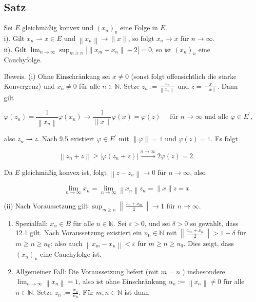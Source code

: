 \documentclass[10pt, letterpaper]{article}
\begin{document}
\subsection*{Satz}
Sei $E$ gleichmäßig konvex und $\left(x_{n}\right)_{n}$ eine Folge in $E$.\\
i). Gilt $x_{n} \rightharpoonup x \in E$ und $\left\|x_{n}\right\| \rightarrow\|x\|$, so folgt $x_{n} \rightarrow x$ für $n \rightarrow \infty$.\\
ii). Gilt $\lim _{n \rightarrow \infty} \sup _{m \geq n}\left|\left\|x_{m}+x_{n}\right\|-2\right|=0$, so ist $\left(x_{n}\right)_{n}$ eine Cauchyfolge.

Beweis. (i) Ohne Einschränkung sei $x \neq 0$ (sonst folgt offensichtlich die starke Konvergenz) und $x_{n} \neq 0$ für alle $n \in \mathbb{N}$. Setze $z_{n}:=\frac{x_{n}}{\left\|x_{n}\right\|}$ und $z=\frac{x}{\|x\|}$. Dann gilt

$$
\varphi\left(z_{n}\right)=\frac{1}{\left\|x_{n}\right\|} \varphi\left(x_{n}\right) \rightarrow \frac{1}{\|x\|} \varphi(x)=\varphi(z) \quad \text { für } n \rightarrow \infty \text { und alle } \varphi \in E^{\prime},
$$

also $z_{n} \rightharpoonup z$. Nach 9.5 existiert $\varphi \in E^{\prime}$ mit $\|\varphi\|=1$ und $\varphi(z)=1$. Es folgt

$$
\left\|z_{n}+z\right\| \geq\left|\varphi\left(z_{n}+z\right)\right| \xrightarrow{n \rightarrow \infty} 2 \varphi(z)=2 .
$$

Da $E$ gleichmäßig konvex ist, folgt $\left\|z-z_{n}\right\| \rightarrow 0$ für $n \rightarrow \infty$, also

$$
\lim _{n \rightarrow \infty} x_{n}=\lim _{n \rightarrow \infty}\left\|x_{n}\right\| z_{n}=\|x\| z=x
$$

(ii) Nach Voraussetzung gilt $\sup _{m \geq n}\left\|\frac{x_{n}+x_{m}}{2}\right\| \rightarrow 1$ für $n \rightarrow \infty$.

\begin{enumerate}
  \item Spezialfall: $x_{n} \in B$ für alle $n \in \mathbb{N}$. Sei $\varepsilon>0$, und sei $\delta>0$ so gewählt, dass 12.1 gilt. Nach Voraussetzung existiert ein $n_{0} \in \mathbb{N}$ mit $\left\|\frac{x_{m}+x_{n}}{2}\right\|>1-\delta$ für $m \geq n \geq n_{0}$; also auch $\left\|x_{m}-x_{n}\right\|<\varepsilon$ für $m \geq n \geq n_{0}$. Dies zeigt, dass $\left(x_{n}\right)_{n}$ eine Cauchyfolge ist.
  \item Allgemeiner Fall: Die Voraussetzung liefert (mit $m=n$ ) insbesondere $\lim _{n \rightarrow \infty}\left\|x_{n}\right\|=1$, also ist ohne Einschränkung $\alpha_{n}:=\left\|x_{n}\right\| \neq 0$ für alle $n \in \mathbb{N}$. Setze $z_{n}:=\frac{x_{n}}{\alpha_{n}}$. Für $m, n \in \mathbb{N}$ ist dann
\end{enumerate}
\end{document}
